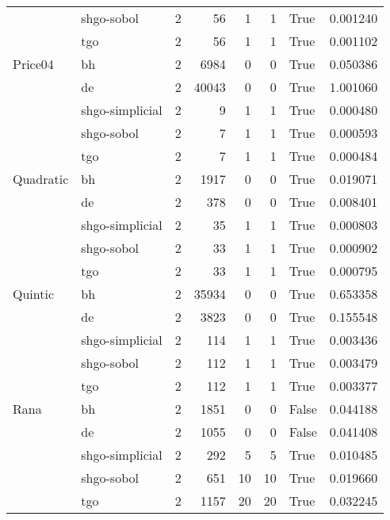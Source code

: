 \begin{longtable}{llrrrrlr}
         & shgo-sobol &     2 &       56 &      1 &       1 &    True &    0.001240 \\
         & tgo &     2 &       56 &      1 &       1 &    True &    0.001102 \\
Price04 & bh &     2 &     6984 &      0 &       0 &    True &    0.050386 \\
         & de &     2 &    40043 &      0 &       0 &    True &    1.001060 \\
         & shgo-simplicial &     2 &        9 &      1 &       1 &    True &    0.000480 \\
         & shgo-sobol &     2 &        7 &      1 &       1 &    True &    0.000593 \\
         & tgo &     2 &        7 &      1 &       1 &    True &    0.000484 \\
Quadratic & bh &     2 &     1917 &      0 &       0 &    True &    0.019071 \\
         & de &     2 &      378 &      0 &       0 &    True &    0.008401 \\
         & shgo-simplicial &     2 &       35 &      1 &       1 &    True &    0.000803 \\
         & shgo-sobol &     2 &       33 &      1 &       1 &    True &    0.000902 \\
         & tgo &     2 &       33 &      1 &       1 &    True &    0.000795 \\
Quintic & bh &     2 &    35934 &      0 &       0 &    True &    0.653358 \\
         & de &     2 &     3823 &      0 &       0 &    True &    0.155548 \\
         & shgo-simplicial &     2 &      114 &      1 &       1 &    True &    0.003436 \\
         & shgo-sobol &     2 &      112 &      1 &       1 &    True &    0.003479 \\
         & tgo &     2 &      112 &      1 &       1 &    True &    0.003377 \\
Rana & bh &     2 &     1851 &      0 &       0 &   False &    0.044188 \\
         & de &     2 &     1055 &      0 &       0 &   False &    0.041408 \\
         & shgo-simplicial &     2 &      292 &      5 &       5 &    True &    0.010485 \\
         & shgo-sobol &     2 &      651 &     10 &      10 &    True &    0.019660 \\
         & tgo &     2 &     1157 &     20 &      20 &    True &    0.032245 \\

\end{longtable}
